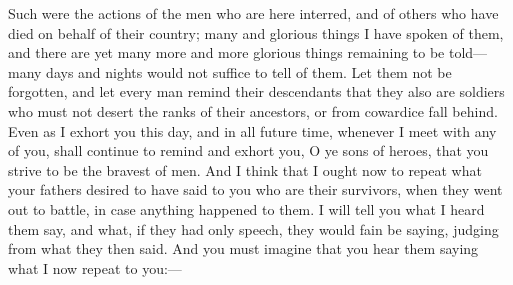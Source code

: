 \documentclass[11pt,letter]{article}
\begin{document}
\par  Such were the actions of the men who are here interred, and of others who have died on behalf of their country; many and glorious things I have spoken of them, and there are yet many more and more glorious things remaining to be told—many days and nights would not suffice to tell of them. Let them not be forgotten, and let every man remind their descendants that they also are soldiers who must not desert the ranks of their ancestors, or from cowardice fall behind. Even as I exhort you this day, and in all future time, whenever I meet with any of you, shall continue to remind and exhort you, O ye sons of heroes, that you strive to be the bravest of men. And I think that I ought now to repeat what your fathers desired to have said to you who are their survivors, when they went out to battle, in case anything happened to them. I will tell you what I heard them say, and what, if they had only speech, they would fain be saying, judging from what they then said. And you must imagine that you hear them saying what I now repeat to you:—
\end{document}
